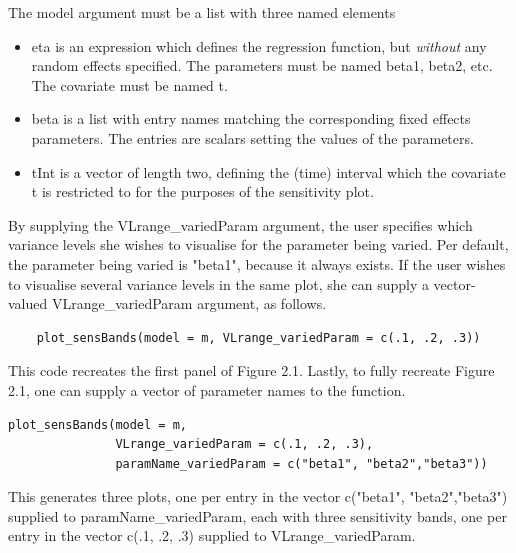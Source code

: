 \documentclass{article}
\theoremstyle{example}
\begin{document}
    
    The \textsf{model} argument must be a list with three named elements
    \begin{itemize}
    	\item \textsf{eta}
    	is an expression which defines the regression function, but \emph{without} any random effects specified. The parameters must be named \textsf{beta1}, \textsf{beta2}, etc. The covariate must be named \textsf{t}.
    	\item \textsf{beta}
    	is a list with entry names matching the corresponding fixed effects parameters. The entries are scalars setting the values of the parameters.
    	\item \textsf{tInt} is a vector of length two, defining the (time) interval which the covariate \textsf{t} is restricted to for the purposes of the sensitivity plot.
    \end{itemize}
    
    By supplying the \textsf{VLrange\_variedParam} argument, the user specifies which variance levels she wishes to visualise for the parameter being varied.
    Per default, the parameter being varied is \textsf{"beta1"}, because it always exists.
    If the user wishes to visualise several variance levels in the same plot, she can supply a vector-valued \textsf{VLrange\_variedParam} argument, as follows.
    
    \begin{verbatim}
    plot_sensBands(model = m, VLrange_variedParam = c(.1, .2, .3))    
    \end{verbatim}
    
    This code recreates the first panel of Figure 2.1.
    Lastly, to fully recreate Figure 2.1, one can supply a vector of parameter names to the function.
    
    \begin{verbatim}
plot_sensBands(model = m, 
               VLrange_variedParam = c(.1, .2, .3), 
               paramName_variedParam = c("beta1", "beta2","beta3"))
    \end{verbatim} 
    
    This generates three plots, one per entry in the vector \textsf{c("beta1", "beta2","beta3")} supplied to \textsf{paramName\_variedParam}, each with three sensitivity bands, one per entry in the vector \textsf{c(.1, .2, .3)} supplied to \textsf{VLrange\_variedParam}.
    
\end{document}
